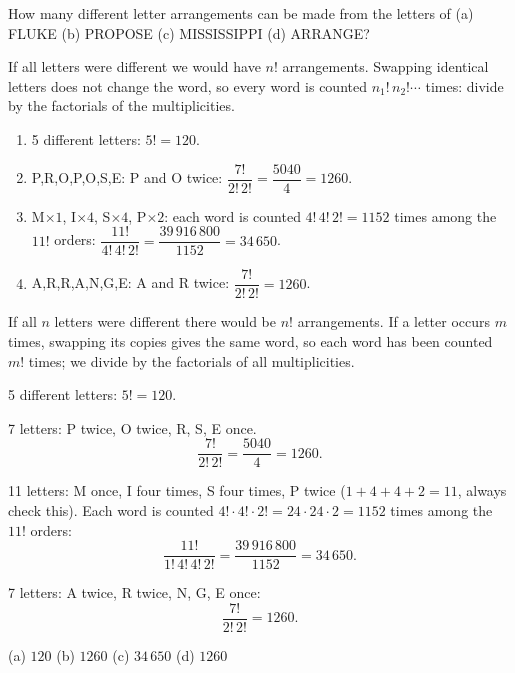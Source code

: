 
\begin{problem}
	How many different letter arrangements can be made from the letters of
	(a) \mbox{FLUKE} \quad (b) \mbox{PROPOSE} \quad (c) \mbox{MISSISSIPPI} \quad (d) \mbox{ARRANGE}?
\end{problem}

\begin{slides}
	\small
	\exstatement
	\pause
	\sol If all letters were different we would have $n!$ arrangements. Swapping
	identical letters does not change the word, so every word is counted
	$n_1!\,n_2!\cdots$ times: divide by the factorials of the multiplicities.
	\begin{enumerate}
		\item[(a)] 5 different letters: $5! = 120$.
		\item[(b)] P,R,O,P,O,S,E: P and O twice: $\dfrac{7!}{2!\,2!} =
			      \dfrac{5040}{4} = 1260$.
		\item[(c)] M$\times1$, I$\times4$, S$\times4$, P$\times2$: each word is
		      counted $4!\,4!\,2!=1152$ times among the $11!$ orders:
		      $\dfrac{11!}{4!\,4!\,2!} = \dfrac{39\,916\,800}{1152} = 34\,650$.
		\item[(d)] A,R,R,A,N,G,E: A and R twice: $\dfrac{7!}{2!\,2!} = 1260$.
	\end{enumerate}
\end{slides}

\begin{solution}
	\idea If all $n$ letters were different there would be $n!$ arrangements.
	If a letter occurs $m$ times, swapping its copies gives the same word, so
	each word has been counted $m!$ times; we divide by the factorials of all
	multiplicities.

	 5 different letters: $5! = 120$.

	 7 letters: P twice, O twice, R, S, E once.
	\[ \frac{7!}{2!\,2!} = \frac{5040}{4} = 1260. \]

	 11 letters: M once, I four times, S four times,
	P twice ($1+4+4+2=11$, always check this). Each word is counted
	$4!\cdot4!\cdot2! = 24\cdot24\cdot2 = 1152$ times among the $11!$ orders:
	\[ \frac{11!}{1!\,4!\,4!\,2!} = \frac{39\,916\,800}{1152} = 34\,650. \]

	 7 letters: A twice, R twice, N, G, E once:
	\[ \frac{7!}{2!\,2!}=1260. \]

	\begin{answer}
		(a) $120$ \quad (b) $1260$ \quad (c) $34\,650$ \quad (d) $1260$
	\end{answer}

\end{solution}
